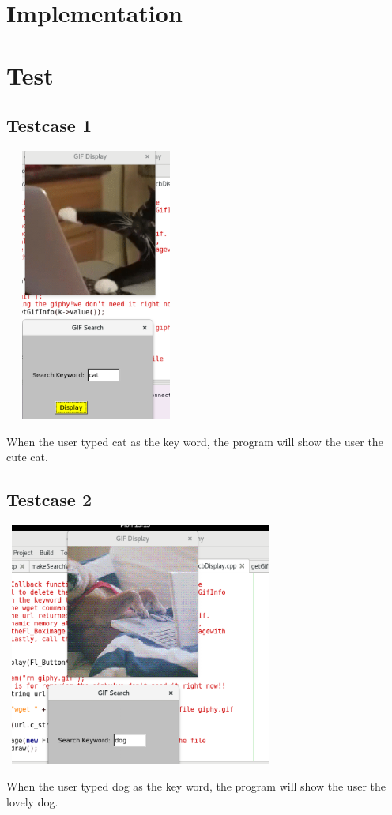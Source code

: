 \documentclass{article}
\begin{document}
\newpage\section*{Implementation}







\newpage\section*{Test}
\subsection*{Testcase 1}
\includegraphics[width = 6cm, height = 9cm]{cat.png}
\begin{description}
	\item When the user typed cat as the key word, the program 
	will show the user the cute cat.
\end{description}
\newpage
\subsection*{Testcase 2}
\includegraphics[width = 9cm, height = 8cm]{dog.png}
\begin{description}
	\item When the user typed dog as the key word, the program 
	will show the user the lovely dog.
\end{description}
\newpage
\end{document}
